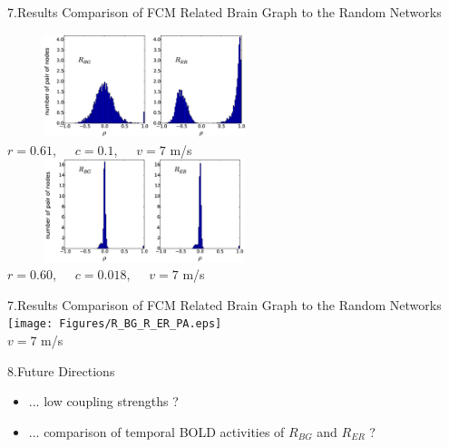 \documentclass{beamer}
\begin{document}
\begin{frame}{7.Results}
\footnotesize{Comparison of FCM Related Brain Graph to the Random Networks}
\begin{center}

\includegraphics[width=8cm, height=3cm]{Figures/R_BG_R_ER_histo_1.eps} \\
\tiny{$r=0.61$,~~~$c=0.1$,~~~$v=7$ m/s} \\
\includegraphics[width=8cm, height=3cm]{Figures/R_BG_R_ER_histo_2.eps} \\
\tiny{$r=0.60$,~~~$c=0.018$,~~~$v=7$ m/s}
\end{center}


\end{frame}





\begin{frame}{7.Results}
\footnotesize{Comparison of FCM Related Brain Graph to the Random Networks}
\centering
\texttt{[image: Figures/R\_BG\_R\_ER\_PA.eps]}\\
\tiny{$v=7$ m/s}

\end{frame}





\begin{frame}{8.Future Directions}
\begin{itemize}
\item ... low coupling strengths ?
\item ... comparison of temporal BOLD activities of $R_{BG}$ and $R_{ER}$ ?
\end{itemize}
\end{frame}
\end{document}

